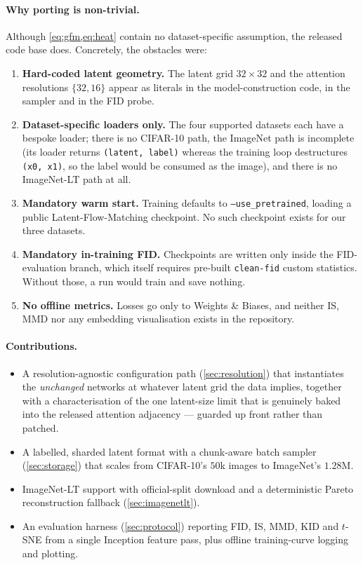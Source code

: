 \documentclass[11pt]{article}
\newcommand{\code}[1]{\texttt{\small #1}}
\begin{document}
\paragraph{Why porting is non-trivial.}
Although \cref{eq:gfm,eq:heat} contain no dataset-specific assumption, the
released code base does. Concretely, the obstacles were:
\begin{enumerate}\itemsep2pt
  \item \textbf{Hard-coded latent geometry.} The latent grid $32\times32$ and the
  attention resolutions $\{32,16\}$ appear as literals in the model-construction
  code, in the sampler and in the FID probe.
  \item \textbf{Dataset-specific loaders only.} The four supported datasets each
  have a bespoke loader; there is no CIFAR-10 path, the ImageNet path is
  incomplete (its loader returns \code{(latent, label)} whereas the training loop
  destructures \code{(x0, x1)}, so the label would be consumed as the image), and
  there is no ImageNet-LT path at all.
  \item \textbf{Mandatory warm start.} Training defaults to
  \code{--use\_pretrained}, loading a public Latent-Flow-Matching checkpoint. No
  such checkpoint exists for our three datasets.
  \item \textbf{Mandatory in-training FID.} Checkpoints are written only inside
  the FID-evaluation branch, which itself requires pre-built \code{clean-fid}
  custom statistics. Without those, a run would train and save nothing.
  \item \textbf{No offline metrics.} Losses go only to Weights \& Biases, and
  neither IS, MMD nor any embedding visualisation exists in the repository.
\end{enumerate}

\paragraph{Contributions.}
\begin{itemize}\itemsep2pt
  \item A resolution-agnostic configuration path (\cref{sec:resolution}) that
  instantiates the \emph{unchanged} networks at whatever latent grid the data
  implies, together with a characterisation of the one latent-size limit that is
  genuinely baked into the released attention adjacency --- guarded up front
  rather than patched.
  \item A labelled, sharded latent format with a chunk-aware batch sampler
  (\cref{sec:storage}) that scales from CIFAR-10's $50$k images to ImageNet's
  $1.28$M.
  \item ImageNet-LT support with official-split download and a deterministic
  Pareto reconstruction fallback (\cref{sec:imagenetlt}).
  \item An evaluation harness (\cref{sec:protocol}) reporting FID, IS, MMD, KID
  and $t$-SNE from a single Inception feature pass, plus offline training-curve
  logging and plotting.
\end{itemize}
\end{document}
